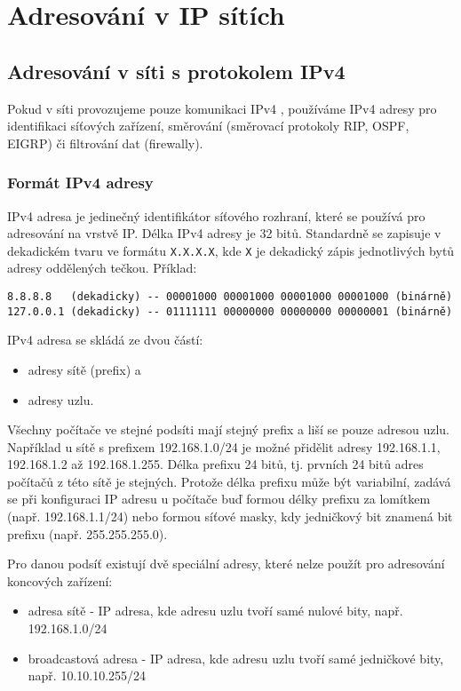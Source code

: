 \section{Adresování v IP sítích}\label{ip_addressing}
\subsection{Adresování v síti s protokolem IPv4}\label{adresy_ipv4}
Pokud v síti provozujeme pouze komunikaci IPv4 \cite{rfc791}, používáme IPv4 adresy pro identifikaci síťových zařízení, směrování (směrovací protokoly RIP, OSPF, EIGRP) či filtrování dat (firewally). 
\subsubsection{Formát IPv4 adresy}
IPv4 adresa je jedinečný identifikátor síťového rozhraní, které se používá pro adresování na vrstvě IP. Délka IPv4 adresy je 32 bitů. Standardně se zapisuje v dekadickém tvaru ve formátu {\tt X.X.X.X}, kde {\tt X} je dekadický zápis jednotlivých bytů adresy oddělených tečkou. Příklad:
\begin{verbatim}
8.8.8.8   (dekadicky) -- 00001000 00001000 00001000 00001000 (binárně)
127.0.0.1 (dekadicky) -- 01111111 00000000 00000000 00000001 (binárně)  
\end{verbatim}

IPv4 adresa se skládá ze dvou částí:
\begin{itemize}
    \item adresy sítě (prefix) a
    \item adresy uzlu.
\end{itemize}

Všechny počítače ve stejné podsíti mají stejný prefix a liší se pouze adresou uzlu. Například u sítě s prefixem 192.168.1.0/24 je možné přidělit adresy 192.168.1.1, 192.168.1.2 až 192.168.1.255. Délka prefixu 24 bitů, tj. prvních 24 bitů adres počítačů z této sítě je stejných. Protože délka prefixu může být variabilní, zadává se při konfiguraci IP adresu u počítače buď formou délky prefixu za lomítkem (např. 192.168.1.1/24) nebo formou síťové masky, kdy jedničkový bit znamená bit prefixu (např. 255.255.255.0). 

\medskip
\noindent
Pro danou podsíť existují dvě speciální adresy, které nelze použít pro adresování koncových zařízení: 
\begin{itemize}
    \item adresa sítě - IP adresa, kde adresu uzlu tvoří samé nulové bity, např. 192.168.1.0/24
    \item broadcastová adresa - IP adresa, kde adresu uzlu tvoří samé jedničkové bity, např. 10.10.10.255/24
\end{itemize}

